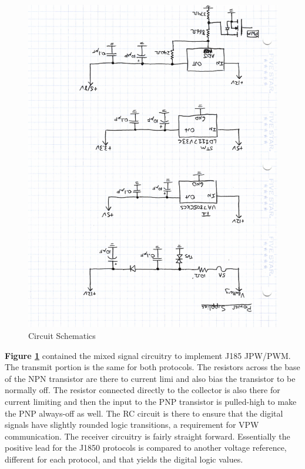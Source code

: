 \documentclass[12pt,letterpaper]{article}
\begin{document}
\begin{figure}[H]
\centering
\includegraphics[page=3, totalheight=20cm, angle=180]{images/circuit_sch.pdf}
\caption{Circuit Schematics}
\label{fig:pwm/vpw}
\end{figure}

\textbf{Figure \ref{fig:pwm/vpw}} contained the mixed signal circuitry to implement J185 JPW/PWM. The transmit portion is the same for both protocols. The resistors across the base of the NPN transistor are there to current limi and also bias the transistor to be normally off. The resistor connected directly to the collector is also there for current limiting and then the input to the PNP transistor is pulled-high to make the PNP always-off as well. The RC circuit is there to ensure that the digital signals have slightly rounded logic transitions, a requirement for VPW communication. The receiver circuitry is fairly straight forward. Essentially the positive lead for the J1850 protocols is compared to another voltage reference, different for each protocol, and that yields the digital logic values.
\end{document}
